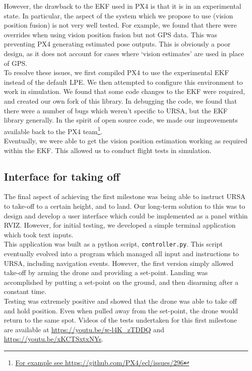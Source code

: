 \documentclass[capstone_report.tex]{subfiles}
\begin{document}
However, the drawback to the EKF used in PX4 is that it is in an experimental state. In particular, the aspect of the system which we propose to use (vision position fusion) is not very well tested. For example, we found that there were overrides when using vision position fusion but not GPS data. This was preventing PX4 generating estimated pose outputs. This is obviously a poor design, as it does not account for cases where `vision estimates' are used in place of GPS.\\

To resolve these issues, we first compiled PX4 to use the experimental EKF instead of the default LPE. We then attempted to configure this environment to work in simulation. We found that some code changes to the EKF were required, and created our own fork of this library. In debugging the code, we found that there were a number of bugs which weren't specific to URSA, but the EKF library generally. In the spirit of open source code, we made our improvements available back to the PX4 team\footnote{\url{For example see https://github.com/PX4/ecl/issues/296}}. \\

Eventually, we were able to get the vision position estimation working as required within the EKF. This allowed us to conduct flight tests in simulation.

\subsection{Interface for taking off}
The final aspect of achieving the first milestone was being able to instruct URSA to take-off to a certain height, and to land. Our long-term solution to this was to design and develop a user interface which could be implemented as a panel within RVIZ. However, for initial testing, we developed a simple terminal application which took text inputs. \\

This application was built as a python script, \texttt{controller.py}. This script eventually evolved into a program which managed all input and instructions to URSA, including navigation events. However, the first version simply allowed take-off by arming the drone and providing a set-point. Landing was accomplished by putting a set-point on the ground, and then disarming after a constant time.\\

Testing was extremely positive and showed that the drone was able to take off and hold position. Even when pulled away from the set-point, the drone would return to the same spot. Videos of the tests undertaken for this first milestone are available at \url{https://youtu.be/w-l4K_zTDDQ} and \url{
https://youtu.be/xKCTSxtxNYs}.\\
\end{document}

